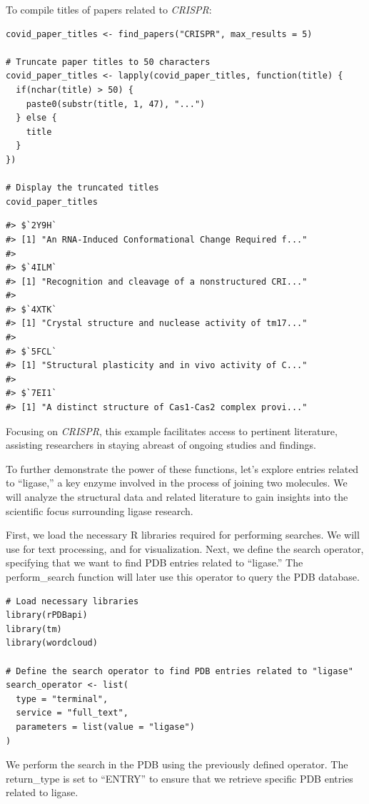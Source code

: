 To compile titles of papers related to \emph{CRISPR}:

\begin{verbatim}
covid_paper_titles <- find_papers("CRISPR", max_results = 5)

# Truncate paper titles to 50 characters
covid_paper_titles <- lapply(covid_paper_titles, function(title) {
  if(nchar(title) > 50) {
    paste0(substr(title, 1, 47), "...")
  } else {
    title
  }
})

# Display the truncated titles
covid_paper_titles
\end{verbatim}

\begin{verbatim}
#> $`2Y9H`
#> [1] "An RNA-Induced Conformational Change Required f..."
#> 
#> $`4ILM`
#> [1] "Recognition and cleavage of a nonstructured CRI..."
#> 
#> $`4XTK`
#> [1] "Crystal structure and nuclease activity of tm17..."
#> 
#> $`5FCL`
#> [1] "Structural plasticity and in vivo activity of C..."
#> 
#> $`7EI1`
#> [1] "A distinct structure of Cas1-Cas2 complex provi..."
\end{verbatim}

Focusing on \emph{CRISPR}, this example facilitates access to pertinent literature, assisting researchers in staying abreast of ongoing studies and findings.

To further demonstrate the power of these functions, let's explore entries related to ``ligase,'' a key enzyme involved in the process of joining two molecules. We will analyze the structural data and related literature to gain insights into the scientific focus surrounding ligase research.

First, we load the necessary R libraries required for performing searches. We will use  for text processing, and  for visualization. Next, we define the search operator, specifying that we want to find PDB entries related to ``ligase.'' The perform\_search function will later use this operator to query the PDB database.

\begin{verbatim}
# Load necessary libraries
library(rPDBapi)  
library(tm)       
library(wordcloud) 

# Define the search operator to find PDB entries related to "ligase"
search_operator <- list(
  type = "terminal",
  service = "full_text",
  parameters = list(value = "ligase")
)
\end{verbatim}

We perform the search in the PDB using the previously defined operator. The return\_type is set to ``ENTRY'' to ensure that we retrieve specific PDB entries related to ligase.

